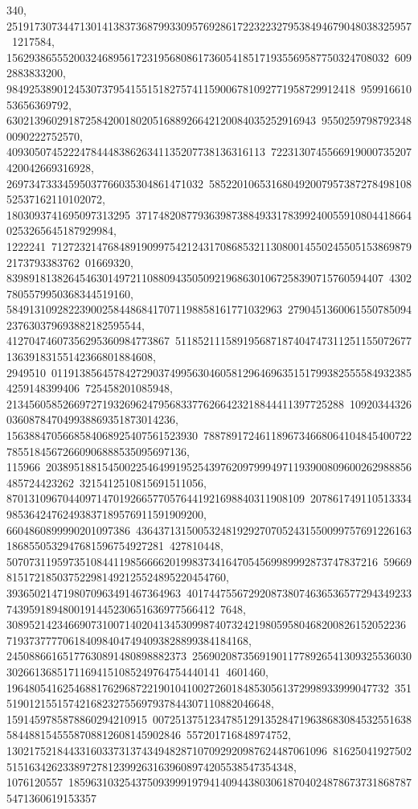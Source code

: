 {{{340, 251917307344713014138373687993309576928617223223279538494679048038325957\
1217584, 15629386555200324689561723195680861736054185171935569587750324708032\
6092883833200, 98492538901245307379541551518275741159006781092771958729912418\
95991661053656369792, 6302139602918725842001802051688926642120084035252916943\
95502597987923480090222752570, 4093050745222478444838626341135207738136316113\
7223130745566919000735207420042669316928, 26973473334595037766035304861471032\
58522010653168049200795738727849810852537162110102072, 1803093741695097313295\
37174820877936398738849331783992400559108044186640253265645187929984, 1222241\
71272321476848919099754212431708685321130800145502455051538698792173793383762\
01669320, 8398918138264546301497211088094350509219686301067258390715760594407\
43027805579950368344519160, 5849131092822390025844868417071198858161771032963\
2790451360061550785094237630379693882182595544, 41270474607356295360984773867\
51185211158919568718740474731125115507267713639183155142366801884608, 2949510\
01191385645784272903749956304605812964696351517993825555849323854259148399406\
725458201085948, 213456058526697271932696247956833776266423218844411397725288\
10920344326036087847049938869351873014236, 1563884705668584068925407561523930\
788789172461189673466806410484540072278551845672660906888535095697136, 115966\
20389518815450022546499195254397620979994971193900809600262988856485724423262\
3215412510815691511056, 87013109670440971470192665770576441921698840311908109\
20786174911051333498536424762493837189576911591909200, 6604860899990201097386\
43643713150053248192927070524315500997576912261631868550532947681596754927281\
427810448, 507073119597351084411985666620199837341647054569989992873747837216\
59669815172185037522981492125524895220454760, 3936502147198070963491467364963\
40174475567292087380746365365772943492337439591894800191445230651636977566412\
7648, 30895214234669073100714020413453099874073242198059580468200826152052236\
7193737777061840984047494093828899384184168, 24508866165177630891480898882373\
25690208735691901177892654130932553603030266136851711694151085249764754440141\
4601460, 19648054162546881762968722190104100272601848530561372998933999047732\
35151901215515742168232755697937844307110882046648, 1591459785878860294210915\
00725137512347851291352847196386830845325516385844881545558708812608145902846\
557201716848974752, 130217521844331603373137434948287107092920987624487061096\
81625041927502515163426233897278123992631639608974205538547354348, 1076120557\
18596310325437509399919794140944380306187040248786737318687875471360619153357\
}}}
